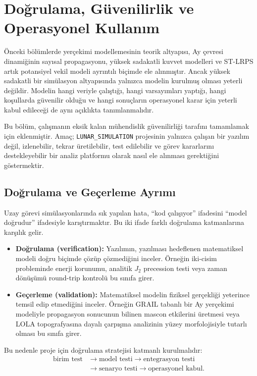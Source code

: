 \chapter{Doğrulama, Güvenilirlik ve Operasyonel Kullanım}
\label{ch:verification_reliability_operations}

Önceki bölümlerde yerçekimi modellemesinin teorik altyapısı, Ay çevresi dinamiğinin sayısal propagasyonu, yüksek sadakatli kuvvet modelleri ve ST-LRPS artık potansiyel vekil modeli ayrıntılı biçimde ele alınmıştır. Ancak yüksek sadakatli bir simülasyon altyapısında yalnızca modelin kurulmuş olması yeterli değildir. Modelin hangi veriyle çalıştığı, hangi varsayımları yaptığı, hangi koşullarda güvenilir olduğu ve hangi sonuçların operasyonel karar için yeterli kabul edileceği de aynı açıklıkta tanımlanmalıdır.

Bu bölüm, çalışmanın eksik kalan mühendislik güvenilirliği tarafını tamamlamak için eklenmiştir. Amaç; \texttt{LUNAR\_SIMULATION} projesinin yalnızca çalışan bir yazılım değil, izlenebilir, tekrar üretilebilir, test edilebilir ve görev kararlarını destekleyebilir bir analiz platformu olarak nasıl ele alınması gerektiğini göstermektir.

\section{Doğrulama ve Geçerleme Ayrımı}
\label{sec:vv_difference}

Uzay görevi simülasyonlarında sık yapılan hata, ``kod çalışıyor'' ifadesini ``model doğrudur'' ifadesiyle karıştırmaktır. Bu iki ifade farklı doğrulama katmanlarına karşılık gelir.

\begin{itemize}
    \item \textbf{Doğrulama (verification):} Yazılımın, yazılması hedeflenen matematiksel modeli doğru biçimde çözüp çözmediğini inceler. Örneğin iki-cisim probleminde enerji korunumu, analitik \(J_2\) precession testi veya zaman dönüşümü round-trip kontrolü bu sınıfa girer.
    \item \textbf{Geçerleme (validation):} Matematiksel modelin fiziksel gerçekliği yeterince temsil edip etmediğini inceler. Örneğin GRAIL tabanlı bir Ay yerçekimi modeliyle propagasyon sonucunun bilinen mascon etkilerini üretmesi veya LOLA topografyasına dayalı çarpışma analizinin yüzey morfolojisiyle tutarlı olması bu sınıfa girer.
\end{itemize}

Bu nedenle proje için doğrulama stratejisi katmanlı kurulmalıdır:
\[
\begin{aligned}
\text{birim test}
&\longrightarrow
\text{model testi}
\longrightarrow
\text{entegrasyon testi} \\
&\longrightarrow
\text{senaryo testi}
\longrightarrow
\text{operasyonel kabul}.
\end{aligned}
\]

